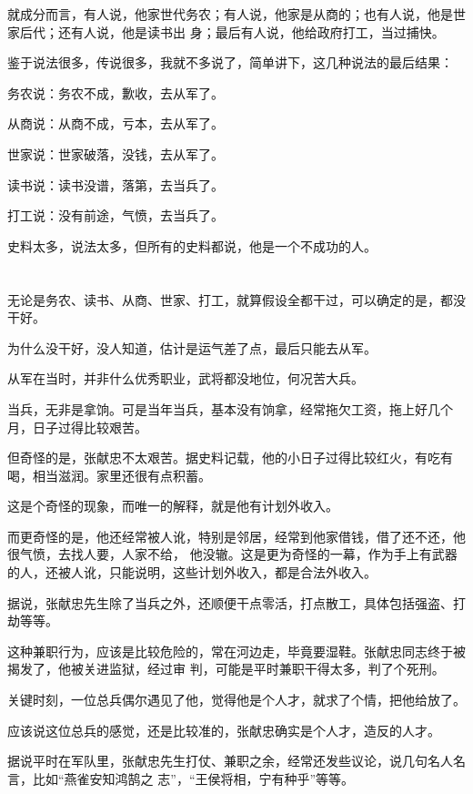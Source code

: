 \documentclass[11pt,a4paper,onecolumn]{article}
\begin{document}
就成分而言，有人说，他家世代务农；有人说，他家是从商的；也有人说，他是世家后代；还有人说，他是读书出
身；最后有人说，他给政府打工，当过捕快。

鉴于说法很多，传说很多，我就不多说了，简单讲下，这几种说法的最后结果：

务农说：务农不成，歉收，去从军了。

从商说：从商不成，亏本，去从军了。

世家说：世家破落，没钱，去从军了。

读书说：读书没谱，落第，去当兵了。

打工说：没有前途，气愤，去当兵了。

史料太多，说法太多，但所有的史料都说，他是一个不成功的人。

\section[\thesection]{}

无论是务农、读书、从商、世家、打工，就算假设全都干过，可以确定的是，都没干好。

为什么没干好，没人知道，估计是运气差了点，最后只能去从军。

从军在当时，并非什么优秀职业，武将都没地位，何况苦大兵。

当兵，无非是拿饷。可是当年当兵，基本没有饷拿，经常拖欠工资，拖上好几个月，日子过得比较艰苦。

但奇怪的是，张献忠不太艰苦。据史料记载，他的小日子过得比较红火，有吃有喝，相当滋润。家里还很有点积蓄。

这是个奇怪的现象，而唯一的解释，就是他有计划外收入。

而更奇怪的是，他还经常被人讹，特别是邻居，经常到他家借钱，借了还不还，他很气愤，去找人要，人家不给，
他没辙。这是更为奇怪的一幕，作为手上有武器的人，还被人讹，只能说明，这些计划外收入，都是合法外收入。

据说，张献忠先生除了当兵之外，还顺便干点零活，打点散工，具体包括强盗、打劫等等。

这种兼职行为，应该是比较危险的，常在河边走，毕竟要湿鞋。张献忠同志终于被揭发了，他被关进监狱，经过审
判，可能是平时兼职干得太多，判了个死刑。

关键时刻，一位总兵偶尔遇见了他，觉得他是个人才，就求了个情，把他给放了。

应该说这位总兵的感觉，还是比较准的，张献忠确实是个人才，造反的人才。

据说平时在军队里，张献忠先生打仗、兼职之余，经常还发些议论，说几句名人名言，比如``燕雀安知鸿鹄之
志''，``王侯将相，宁有种乎''等等。
\end{document}

